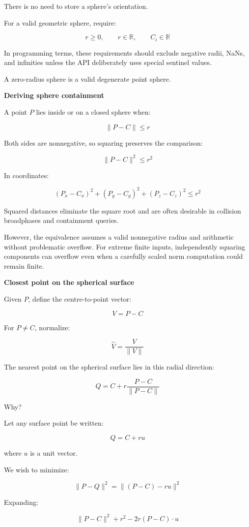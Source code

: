 There is no need to store a sphere's orientation.

For a valid geometric sphere, require:

\[
r\ge0,\qquad r\in\mathbb R,\qquad C_i\in\mathbb R
\]

In programming terms, these requirements should exclude negative radii, NaNs, and infinities unless the API deliberately uses special sentinel values.

A zero-radius sphere is a valid degenerate point sphere.

\textbf{Deriving sphere containment}

A point \(P\) lies inside or on a closed sphere when:

\[
\|P-C\|\le r
\]

Both sides are nonnegative, so squaring preserves the comparison:

\[
\boxed{\|P-C\|^2\le r^2}
\]

In coordinates:

\[
(P_x-C_x)^2+ (P_y-C_y)^2+ (P_z-C_z)^2\le r^2
\]

Squared distances eliminate the square root and are often desirable in collision broadphases and containment queries.

However, the equivalence assumes a valid nonnegative radius and arithmetic without problematic overflow. For extreme finite inputs, independently squaring components can overflow even when a carefully scaled norm computation could remain finite.

\textbf{Closest point on the spherical surface}

Given \(P\), define the centre-to-point vector:

\[
V=P-C
\]

For \(P\ne C\), normalize:

\[
\hat V=\frac{V}{\|V\|}
\]

The nearest point on the spherical surface lies in this radial direction:

\[
\boxed{ Q=C+r\frac{P-C}{\|P-C\|} }
\]

Why?

Let any surface point be written:

\[
Q=C+ru
\]

where \(u\) is a unit vector.

We wish to minimize:

\[
\|P-Q\|^2 =\|(P-C)-ru\|^2
\]

Expanding:

\[
\|P-C\|^2+r^2-2r(P-C)\cdot u
\]


